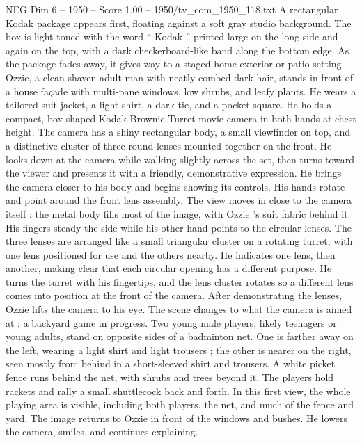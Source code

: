 \begin{textsample}{NEG Dim 6 – 1950 – Score 1.00 – 1950/tv\_com\_1950\_118.txt}  \label{ex:f6_neg_087}
A rectangular Kodak package appears first, floating against a soft gray studio background.
The box is light-toned with the word “ Kodak ” printed large on the long side and again on the top, with a dark checkerboard-like band along the bottom edge.
As the package fades away, it gives way to a staged home exterior or patio setting.
Ozzie, a clean-shaven adult man with neatly combed dark hair, stands in front of a house façade with multi-pane windows, low shrubs, and leafy plants.
He wears a tailored suit jacket, a light shirt, a dark tie, and a pocket square.
He holds a compact, box-shaped Kodak Brownie Turret movie camera in both hands at chest height.
The camera has a shiny rectangular body, a small viewfinder on top, and a distinctive cluster of three round lenses mounted together on the front.
He looks down at the camera while walking slightly across the set, then turns toward the viewer and presents it with a friendly, demonstrative expression.
He brings the camera closer to his body and begins showing its controls.
His hands rotate and point around the front lens assembly.
The view moves in close to the camera itself : the metal body fills most of the image, with Ozzie ’s suit fabric behind it.
His fingers steady the side while his other hand points to the circular lenses.
The three lenses are arranged like a small triangular cluster on a rotating turret, with one lens positioned for use and the others nearby.
He indicates one lens, then another, making clear that each circular opening has a different purpose.
He turns the turret with his fingertips, and the lens cluster rotates so a different lens comes into position at the front of the camera.
After demonstrating the lenses, Ozzie lifts the camera to his eye.
The scene changes to what the camera is aimed at : a backyard game in progress.
Two young male players, likely teenagers or young adults, stand on opposite sides of a badminton net.
One is farther away on the left, wearing a light shirt and light trousers ; the other is nearer on the right, seen mostly from behind in a short-sleeved shirt and trousers.
A white picket fence runs behind the net, with shrubs and trees beyond it.
The players hold rackets and rally a small shuttlecock back and forth.
In this first view, the whole playing area is visible, including both players, the net, and much of the fence and yard.
The image returns to Ozzie in front of the windows and bushes.
He lowers the camera, smiles, and continues explaining.

\end{textsample}
